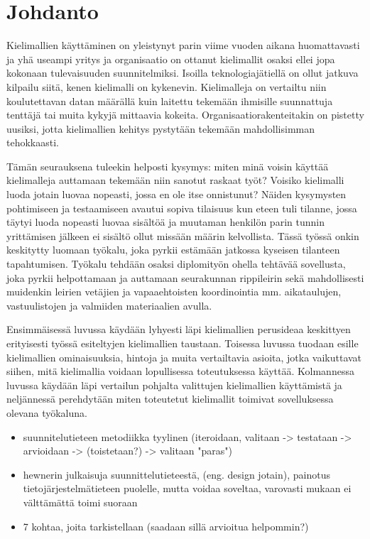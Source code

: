 \chapter{Johdanto}%
\label{ch:johdanto}

Kielimallien käyttäminen on yleistynyt parin viime vuoden aikana huomattavasti
ja yhä useampi yritys ja organisaatio on ottanut kielimallit osaksi ellei jopa
kokonaan tulevaisuuden suunnitelmiksi. Isoilla teknologiajätiellä on ollut
jatkuva kilpailu siitä, kenen kielimalli on kykenevin. Kielimalleja on
vertailtu niin koulutettavan datan määrällä kuin laitettu tekemään ihmisille
suunnattuja tenttäjä tai muita kykyjä mittaavia kokeita.
Organisaatiorakenteitakin on pistetty uusiksi, jotta kielimallien kehitys
pystytään tekemään mahdollisimman tehokkaasti.

Tämän seurauksena tuleekin helposti kysymys: miten minä voisin käyttää
kielimalleja auttamaan tekemään niin sanotut raskaat työt? Voisiko kielimalli
luoda jotain luovaa nopeasti, jossa en ole itse onnistunut? Näiden kysymysten
pohtimiseen ja testaamiseen avautui sopiva tilaisuus kun eteen tuli tilanne,
jossa täytyi luoda nopeasti luovaa sisältöä ja muutaman henkilön parin tunnin
yrittämisen jälkeen ei sisältö ollut missään määrin kelvollista. Tässä työssä
onkin keskitytty luomaan työkalu, joka pyrkii estämään jatkossa kyseisen
tilanteen tapahtumisen. Työkalu tehdään osaksi diplomityön ohella tehtävää
sovellusta, joka pyrkii helpottamaan ja auttamaan seurakunnan rippileirin sekä
mahdollisesti muidenkin leirien vetäjien ja vapaaehtoisten koordinointia mm.
aikataulujen, vastuulistojen ja valmiiden materiaalien avulla.

Ensimmäisessä luvussa käydään lyhyesti läpi kielimallien perusideaa keskittyen
erityisesti työssä esiteltyjen kielimallien taustaan. Toisessa luvussa
tuodaan esille kielimallien ominaisuuksia, hintoja ja muita vertailtavia
asioita, jotka vaikuttavat siihen, mitä kielimallia voidaan lopullisessa
toteutuksessa käyttää. Kolmannessa luvussa käydään läpi vertailun pohjalta
valittujen kielimallien käyttämistä ja neljännessä perehdytään miten toteutetut
kielimallit toimivat sovelluksessa olevana työkaluna.


\begin{itemize}
  \item suunnitelutieteen metodiikka tyylinen (iteroidaan, valitaan -> testataan -> arvioidaan -> (toistetaan?) -> valitaan "paras")
  \item hewnerin julkaisuja suunnittelutieteestä, (eng. design jotain), painotus tietojärjestelmätieteen puolelle, mutta voidaa soveltaa, varovasti mukaan ei välttämättä toimi suoraan
  \item 7 kohtaa, joita tarkistellaan (saadaan sillä arvioitua helpommin?)
\end{itemize}
